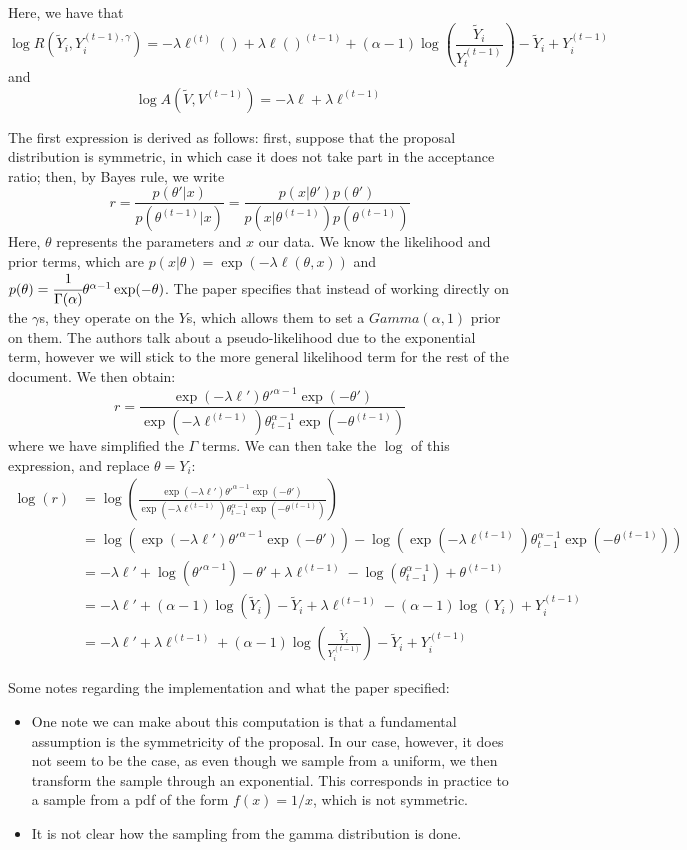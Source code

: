 \documentclass[12pt]{memoir}
\begin{document}
Here, we have that 
$$
\log R(\tilde Y_i, Y_i^{(t-1), \gamma}) = - \lambda \ell^{(t)}() + \lambda \ell()^{(t-1)} + (\alpha - 1) \log\left(\frac{\tilde Y_i}{Y_t^{(t-1)}}\right) - \tilde Y_i + Y_i^{(t-1)}
$$
and 
$$
\log A(\tilde V, V^{(t-1)}) = -\lambda \ell + \lambda \ell^{(t-1)} 
$$

The first expression is derived as follows: first, suppose that the proposal distribution is symmetric, in which case it does not take part in the acceptance ratio; then, by Bayes rule, we write
$$
r = \frac{p(\theta'|x)}{p(\theta^{(t-1)}|x)} = \frac{p(x|\theta') p(\theta')}{p(x|\theta^{(t-1)})p(\theta^{(t-1)})}
$$
Here, $\theta$ represents the parameters and $x$ our data. We know the likelihood and prior terms, which are $p(x|\theta) = \exp(-\lambda \ell(\theta, x))$ and $p(\theta) = \cfrac{1}{\Gamma(\alpha)}\theta^{\alpha - 1} \exp(-\theta)$. The paper specifies that instead of working directly on the $\gamma$s, they operate on the $Y$s, which allows them to set a $Gamma(\alpha, 1)$ prior on them. The authors talk about a pseudo-likelihood due to the exponential term, however we will stick to the more general likelihood term for the rest of the document. We then obtain:
$$
r = \frac{\exp(-\lambda \ell') \theta'^{\alpha - 1} \exp(-\theta')}{\exp(-\lambda \ell^{(t-1)}) \theta_{t-1}^{\alpha - 1} \exp(-\theta^{(t-1)})}
$$
where we have simplified the $\Gamma$ terms. We can then take the $\log$ of this expression, and replace $\theta = Y_i$:
\begin{align*}
\log(r) &= \log \left( \frac{\exp(-\lambda \ell') \theta'^{\alpha - 1} \exp(-\theta')}{\exp(-\lambda \ell^{(t-1)}) \theta_{t-1}^{\alpha - 1} \exp(-\theta^{(t-1)})}\right)\\
&= \log(\exp(-\lambda \ell') \theta'^{\alpha - 1} \exp(-\theta')) - \log(\exp(-\lambda \ell^{(t-1)}) \theta_{t-1}^{\alpha - 1} \exp(-\theta^{(t-1)}))\\
&= -\lambda \ell' + \log(\theta'^{\alpha - 1}) - \theta' + \lambda \ell^{(t-1)} - \log(\theta_{t-1}^{\alpha - 1}) + \theta^{(t-1)}\\
&= -\lambda \ell' + (\alpha - 1) \log(\tilde Y_i) - \tilde Y_i + \lambda \ell^{(t-1)} - (\alpha - 1) \log(Y_i) + Y_i^{(t-1)}\\
&= -\lambda \ell' + \lambda \ell^{(t-1)} + (\alpha - 1) \log\left(\frac{\tilde Y_i}{Y_i^{(t-1)}} \right) - \tilde Y_i + Y_i^{(t-1)}
\end{align*}

Some notes regarding the implementation and what the paper specified:
\begin{itemize}
    \item One note we can make about this computation is that a fundamental assumption is the symmetricity of the proposal. In our case, however, it does not seem to be the case, as even though we sample from a uniform, we then transform the sample through an exponential. This corresponds in practice to a sample from a pdf of the form $f(x) = 1/x$, which is not symmetric.
    \item It is not clear how the sampling from the gamma distribution is done. 
\end{itemize}
\end{document}
